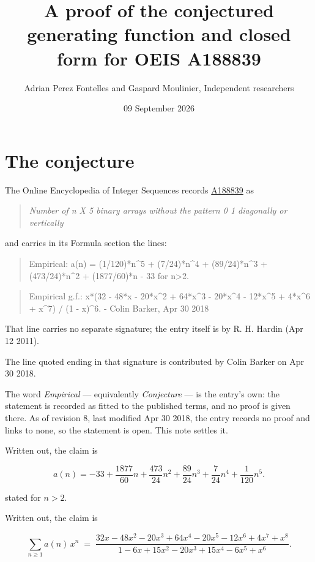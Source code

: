 \documentclass[11pt]{article}
\title{A proof of the conjectured generating function and closed form for OEIS A188839}
\author{Adrian Perez Fontelles and Gaspard Moulinier, Independent researchers}
\date{09 September 2026}
\theoremstyle{definition}
\begin{document}
\maketitle
\section{The conjecture}

The Online Encyclopedia of Integer Sequences records \href{https://oeis.org/A188839}{A188839} as

\begin{quote}\itshape Number of n X 5 binary arrays without the pattern 0 1 diagonally or vertically\end{quote}

and carries in its Formula section the lines:

\begin{quote}\ttfamily Empirical: a(n) = (1/120)*n\textasciicircum{}5 + (7/24)*n\textasciicircum{}4 + (89/24)*n\textasciicircum{}3 + (473/24)*n\textasciicircum{}2 + (1877/60)*n - 33 for n>2.\end{quote}

\begin{quote}\ttfamily Empirical g.f.: x*(32 - 48*x - 20*x\textasciicircum{}2 + 64*x\textasciicircum{}3 - 20*x\textasciicircum{}4 - 12*x\textasciicircum{}5 + 4*x\textasciicircum{}6 + x\textasciicircum{}7) / (1 - x)\textasciicircum{}6. - Colin Barker, Apr 30 2018\end{quote}

That line carries no separate signature; the entry itself is by R. H. Hardin (Apr 12 2011).

The line quoted ending in that signature is contributed by Colin Barker on Apr 30 2018.

The word {\itshape Empirical} --- equivalently {\itshape Conjecture} --- is the entry's own: the statement is recorded as fitted to the published terms, and no proof is given there. As of revision 8, last modified Apr 30 2018, the entry records no proof and links to none, so the statement is open. This note settles it.

Written out, the claim is

\[a(n) = -33 + \frac{1877}{60}n + \frac{473}{24}n^{2} + \frac{89}{24}n^{3} + \frac{7}{24}n^{4} + \frac{1}{120}n^{5}.\]

stated for $n > 2$.

Written out, the claim is

\[\sum_{n \ge 1} a(n)\,x^n \;=\; \frac{32x - 48x^{2} - 20x^{3} + 64x^{4} - 20x^{5} - 12x^{6} + 4x^{7} + x^{8}}{1 - 6x + 15x^{2} - 20x^{3} + 15x^{4} - 6x^{5} + x^{6}}.\]
\end{document}
